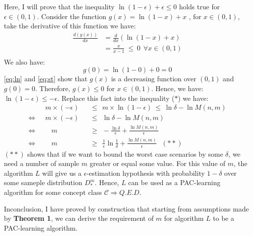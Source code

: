 \documentclass[a4paper,12pt]{article}
\begin{document}
Here, I will prove that the inequality $\ln(1-\epsilon) + \epsilon \leq 0$ holds true for $\epsilon \in (0,1)$. Consider the function $g(x) = \ln(1-x) + x \mbox{ , for } x \in (0,1)$, take the derivative of this function we have:
\begin{equation} \label{eq:ln}
    \begin{aligned}
        \frac{d(g(x))}{dx} & = \frac{d}{dx} (\ln(1-x) + x)\\[0.8em] & = \frac{x}{x-1} \ \leq \ 0 \ \ \forall x \in (0,1) \\
    \end{aligned}
\end{equation}
We also have:
\begin{equation} \label{eq:st}
    g(0) = \ln(1-0) + 0 = 0
\end{equation}
\eqref{eq:ln} and \eqref{eq:st} show that $g(x)$ is a decreasing function over $(0,1)$ and $g(0) = 0$. Therefore, $g(x) \leq 0$ for $x \in (0,1)$. Hence, we have: $\ln(1-\epsilon) \leq -\epsilon $. Replace this fact into the inequality ($\boldsymbol{\ast}$) we have:
\begin{equation*}
    \begin{aligned}
       & m \times (-\epsilon) &&\leq \ \ m \times \ln(1-\epsilon) \ \leq \ \ln \delta - \ln M(n,m) \\
       \Leftrightarrow \ \ \ & m \times (-\epsilon)&& \leq \ \ \ln \delta - \ln M(n,m) \\
       \Leftrightarrow \ \ \ & \ \ \ \ m && \geq \ \ - \frac{\ln \delta}{\epsilon} + \frac{\ln M(n,m)}{\epsilon} \\
       \Leftrightarrow \ \ \ & \ \ \ \ m && \geq \ \ \frac{1}{\epsilon}\ln\frac{1}{\delta} + \frac{\ln M(n,m)}{\epsilon} \ \ \ (\boldsymbol{\ast\ast})
    \end{aligned}
\end{equation*}
$(\boldsymbol{\ast\ast})$ shows that if we want to bound the worst case scenarios by some $\delta$, we need a number of sample $m$ greater or equal some value. For this value of $m$, the algorithm $L$ will give us a $\epsilon$-estimation hypothesis with probability $1-\delta$ over some sameple distribution $D_*^m$. Hence, $L$ can be used as a PAC-learning algorithm for some concept class $\mathcal{C}\Rightarrow Q.E.D. $

Inconclusion, I have proved by construction that starting from assumptions made by \textbf{Theorem 1}, we can derive the requirement of $m$ for algorithm $L$ to be a PAC-learning algorithm.


\end{document}
